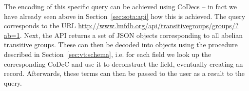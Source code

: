 The encoding of this specific query can be achieved using CoDecs -- in fact we have already seen above in Section~\ref{sec:sota:api} how this is achieved. 
The query corresponds to the URL \url{http://www.lmfdb.org/api/transitivegroups/groups/?ab=1}. 
Next, the \lmfdb API returns a set of JSON objects corresponding to all abelian transitive groups. 
These can then be decoded into \ommt objects using the procedure described in Section~\ref{sec:vt:schema}, i.e. for each field we look up the corresponding CoDeC and use it to deconstruct the field, eventually creating an \mmt record. 
Afterwards, these \ommt terms can then be passed to the user as a result to the query. 

